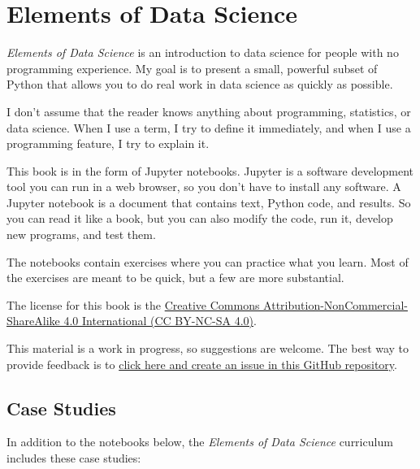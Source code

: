 \hypertarget{elements-of-data-science}{%
\section{Elements of Data Science}\label{elements-of-data-science}}

\emph{Elements of Data Science} is an introduction to data science for
people with no programming experience. My goal is to present a small,
powerful subset of Python that allows you to do real work in data
science as quickly as possible.

I don't assume that the reader knows anything about programming,
statistics, or data science. When I use a term, I try to define it
immediately, and when I use a programming feature, I try to explain it.

This book is in the form of Jupyter notebooks. Jupyter is a software
development tool you can run in a web browser, so you don't have to
install any software. A Jupyter notebook is a document that contains
text, Python code, and results. So you can read it like a book, but you
can also modify the code, run it, develop new programs, and test them.

The notebooks contain exercises where you can practice what you learn.
Most of the exercises are meant to be quick, but a few are more
substantial.

The license for this book is the
\href{https://creativecommons.org/licenses/by-nc-sa/4.0/}{Creative
Commons Attribution-NonCommercial-ShareAlike 4.0 International (CC
BY-NC-SA 4.0)}.

This material is a work in progress, so suggestions are welcome. The
best way to provide feedback is to
\href{https://github.com/AllenDowney/ElementsOfDataScience/issues}{click
here and create an issue in this GitHub repository}.

\hypertarget{case-studies}{%
\subsection{Case Studies}\label{case-studies}}

In addition to the notebooks below, the \emph{Elements of Data Science}
curriculum includes these case studies:

